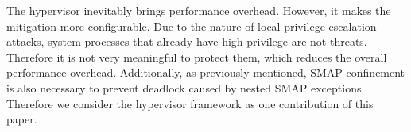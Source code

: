 The hypervisor inevitably brings performance overhead. However, it makes the mitigation more configurable. Due to the nature of local privilege escalation attacks, system processes that already have high privilege are not threats. Therefore it is not very meaningful to protect them, which reduces the overall performance overhead.  Additionally, as previously mentioned, SMAP confinement is also necessary to prevent deadlock caused by nested SMAP exceptions. Therefore we consider the hypervisor framework as one contribution of this paper.
